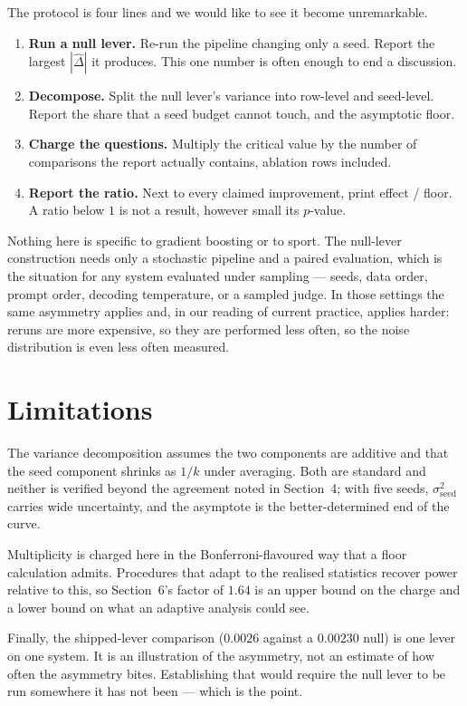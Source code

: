 \documentclass{article}
\begin{document}
The protocol is four lines and we would like to see it become unremarkable.

\begin{enumerate}\itemsep2pt
\item \textbf{Run a null lever.} Re-run the pipeline changing only a seed. Report the largest $|\widehat\Delta|$ it produces. This one number is often enough to end a discussion.
\item \textbf{Decompose.} Split the null lever's variance into row-level and seed-level. Report the share that a seed budget cannot touch, and the asymptotic floor.
\item \textbf{Charge the questions.} Multiply the critical value by the number of comparisons the report actually contains, ablation rows included.
\item \textbf{Report the ratio.} Next to every claimed improvement, print effect / floor. A ratio below $1$ is not a result, however small its $p$-value.
\end{enumerate}

Nothing here is specific to gradient boosting or to sport. The null-lever construction needs only a stochastic pipeline and a paired evaluation, which is the situation for any system evaluated under sampling --- seeds, data order, prompt order, decoding temperature, or a sampled judge. In those settings the same asymmetry applies and, in our reading of current practice, applies harder: reruns are more expensive, so they are performed less often, so the noise distribution is even less often measured.

\section{Limitations}

The variance decomposition assumes the two components are additive and that the seed component shrinks as $1/k$ under averaging. Both are standard and neither is verified beyond the agreement noted in Section~4; with five seeds, $\sigma^2_{\text{seed}}$ carries wide uncertainty, and the asymptote is the better-determined end of the curve.

Multiplicity is charged here in the Bonferroni-flavoured way that a floor calculation admits. Procedures that adapt to the realised statistics recover power relative to this, so Section~6's factor of $1.64$ is an upper bound on the charge and a lower bound on what an adaptive analysis could see.

Finally, the shipped-lever comparison ($0.0026$ against a $0.00230$ null) is one lever on one system. It is an illustration of the asymmetry, not an estimate of how often the asymmetry bites. Establishing that would require the null lever to be run somewhere it has not been --- which is the point.
\end{document}
